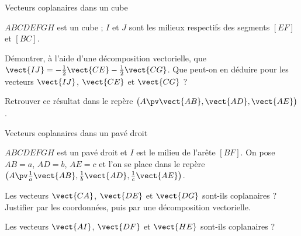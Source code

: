 \begin{exercice}[2]{Vecteurs coplanaires dans un cube}
\begin{codecote}[0.6]
$ABCDEFGH$ est un cube ; $I$ et $J$ sont les milieux respectifs des segments $[EF]$ et $[BC]$.
\begin{questions}
  \item Démontrer, à l'aide d'une décomposition vectorielle, que $\vect{IJ}=-\frac12\vect{CE}-\frac12\vect{CG}$. Que peut-on en
    déduire pour les vecteurs $\vect{IJ}$, $\vect{CE}$ et $\vect{CG}$ ?
  \item Retrouver ce résultat dans le repère $\big(A\pv\vect{AB},\vect{AD},\vect{AE}\big)$.
\end{questions}
\cote
\centering
{}
\end{codecote}
\end{exercice}

\begin{exercice}[2]{Vecteurs coplanaires dans un pavé droit}
\begin{codecote}[0.56]
$ABCDEFGH$ est un pavé droit et $I$ est le milieu de l'arête $[BF]$. On pose $AB=a$, $AD=b$, $AE=c$ et l'on se place dans le repère
$\big(A\pv\tfrac1a\vect{AB},\tfrac1b\vect{AD},\tfrac1c\vect{AE}\big)$.
\begin{questions}
  \item Les vecteurs $\vect{CA}$, $\vect{DE}$ et $\vect{DG}$ sont-ils coplanaires ? Justifier par les coordonnées, puis par une
    décomposition vectorielle.
  \item Les vecteurs $\vect{AI}$, $\vect{DF}$ et $\vect{HE}$ sont-ils coplanaires ?
\end{questions}
\cote
\centering
{}
\end{codecote}
\end{exercice}


